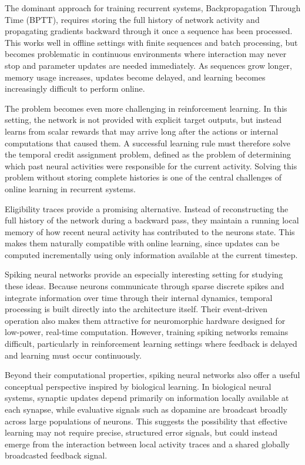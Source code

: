 The dominant approach for training recurrent systems, Backpropagation Through Time (BPTT), requires storing the full history of network activity and propagating gradients backward through it once a sequence has been processed. This works well in offline settings with finite sequences and batch processing, but becomes problematic in continuous environments where interaction may never stop and parameter updates are needed immediately. As sequences grow longer, memory usage increases, updates become delayed, and learning becomes increasingly difficult to perform online.

The problem becomes even more challenging in reinforcement learning. In this setting, the network is not provided with explicit target outputs, but instead learns from scalar rewards that may arrive long after the actions or internal computations that caused them. A successful learning rule must therefore solve the temporal credit assignment problem, defined as the problem of determining which past neural activities were responsible for the current activity. Solving this problem without storing complete histories is one of the central challenges of online learning in recurrent systems.

Eligibility traces provide a promising alternative. Instead of reconstructing the full history of the network during a backward pass, they maintain a running local memory of how recent neural activity has contributed to the neurons state. This makes them naturally compatible with online learning, since updates can be computed incrementally using only information available at the current timestep.

Spiking neural networks provide an especially interesting setting for studying these ideas. Because neurons communicate through sparse discrete spikes and integrate information over time through their internal dynamics, temporal processing is built directly into the architecture itself. Their event-driven operation also makes them attractive for neuromorphic hardware designed for low-power, real-time computation. However, training spiking networks remains difficult, particularly in reinforcement learning settings where feedback is delayed and learning must occur continuously.

Beyond their computational properties, spiking neural networks also offer a useful conceptual perspective inspired by biological learning. In biological neural systems, synaptic updates depend primarily on information locally available at each synapse, while evaluative signals such as dopamine are broadcast broadly across large populations of neurons. This suggests the possibility that effective learning may not require precise, structured error signals, but could instead emerge from the interaction between local activity traces and a shared globally broadcasted feedback signal.

